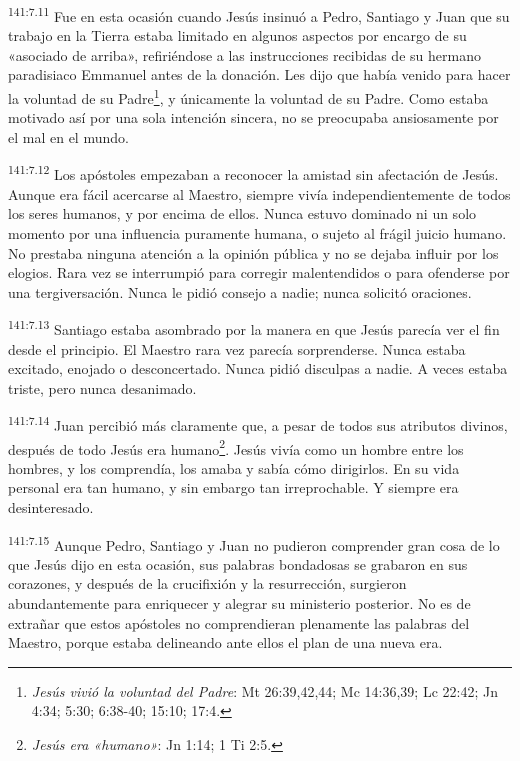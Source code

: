 \par 
\textsuperscript{141:7.11} Fue en esta ocasión cuando Jesús insinuó a Pedro, Santiago y Juan que su trabajo en la Tierra estaba limitado en algunos aspectos por encargo de su «asociado de arriba», refiriéndose a las instrucciones recibidas de su hermano paradisiaco Emmanuel antes de la donación. Les dijo que había venido para hacer la voluntad de su Padre\footnote{\textit{Jesús vivió la voluntad del Padre}: Mt 26:39,42,44; Mc 14:36,39; Lc 22:42; Jn 4:34; 5:30; 6:38-40; 15:10; 17:4.}, y únicamente la voluntad de su Padre. Como estaba motivado así por una sola intención sincera, no se preocupaba ansiosamente por el mal en el mundo.

\par 
\textsuperscript{141:7.12} Los apóstoles empezaban a reconocer la amistad sin afectación de Jesús. Aunque era fácil acercarse al Maestro, siempre vivía independientemente de todos los seres humanos, y por encima de ellos. Nunca estuvo dominado ni un solo momento por una influencia puramente humana, o sujeto al frágil juicio humano. No prestaba ninguna atención a la opinión pública y no se dejaba influir por los elogios. Rara vez se interrumpió para corregir malentendidos o para ofenderse por una tergiversación. Nunca le pidió consejo a nadie; nunca solicitó oraciones.

\par 
\textsuperscript{141:7.13} Santiago estaba asombrado por la manera en que Jesús parecía ver el fin desde el principio. El Maestro rara vez parecía sorprenderse. Nunca estaba excitado, enojado o desconcertado. Nunca pidió disculpas a nadie. A veces estaba triste, pero nunca desanimado.

\par 
\textsuperscript{141:7.14} Juan percibió más claramente que, a pesar de todos sus atributos divinos, después de todo Jesús era humano\footnote{\textit{Jesús era «humano»}: Jn 1:14; 1 Ti 2:5.}. Jesús vivía como un hombre entre los hombres, y los comprendía, los amaba y sabía cómo dirigirlos. En su vida personal era tan humano, y sin embargo tan irreprochable. Y siempre era desinteresado.

\par 
\textsuperscript{141:7.15} Aunque Pedro, Santiago y Juan no pudieron comprender gran cosa de lo que Jesús dijo en esta ocasión, sus palabras bondadosas se grabaron en sus corazones, y después de la crucifixión y la resurrección, surgieron abundantemente para enriquecer y alegrar su ministerio posterior. No es de extrañar que estos apóstoles no comprendieran plenamente las palabras del Maestro, porque estaba delineando ante ellos el plan de una nueva era.

